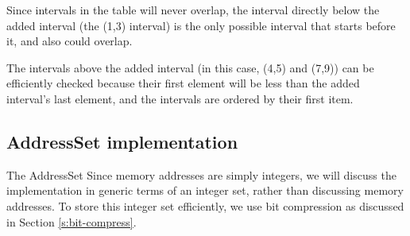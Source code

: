 \documentclass[12pt,twoside]{reedthesis}
\begin{document}
			Since intervals in the table will never overlap, the interval directly below the added interval (the (1,3) interval) is the only possible interval that starts before it, and also could overlap.%
			
			The intervals above the added interval (in this case, (4,5) and (7,9)) can be efficiently checked because their first element will be less than the added interval's last element, and the intervals are ordered by their first item. %
			
			
			
		\subsection{AddressSet implementation}\label{s:access-set}
			
			
			
			The AddressSet
			Since memory addresses are simply integers, we will discuss the implementation in generic terms of an integer set, rather than discussing memory addresses. To store this integer set efficiently, we use bit compression as discussed in Section \ref{s:bit-compress}.
			
\end{document}
